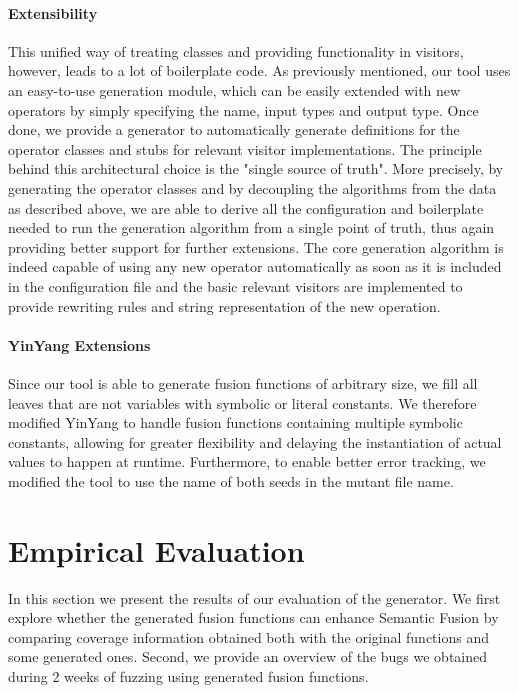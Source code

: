 \documentclass[sigplan,screen]{acmart}
\begin{document}
\paragraph{Extensibility}
This unified way of treating classes and providing functionality in visitors, however, leads to a lot of boilerplate code. As previously mentioned, our tool uses an easy-to-use generation module, which can be easily extended with new operators by simply specifying the name, input types and output type. Once done, we provide a generator to automatically generate definitions for the operator classes and stubs for relevant visitor implementations. The principle behind this architectural choice is the "single source of truth". More precisely, by generating the operator classes and by decoupling the algorithms from the data as described above, we are able to derive all the configuration and boilerplate needed to run the generation algorithm from a single point of truth, thus again providing better support for further extensions. The core generation algorithm is indeed capable of using any new operator automatically as soon as it is included in the configuration file and the basic relevant visitors are implemented to provide rewriting rules and string representation of the new operation.

\paragraph{YinYang Extensions}
Since our tool is able to generate fusion functions of arbitrary size, we fill all leaves that are not variables with symbolic or literal constants.
We therefore modified YinYang to handle fusion functions containing multiple symbolic constants, allowing for greater flexibility and delaying the instantiation of actual values to happen at runtime. Furthermore, to enable better error tracking, we modified the tool to use the name of both seeds in the mutant file name.

\section{Empirical Evaluation} \label{sec:evaluation}
In this section we present the results of our evaluation of the generator. We first explore whether the generated fusion functions can enhance Semantic Fusion by comparing coverage information obtained both with the original functions and some generated ones. Second, we provide an overview of the bugs we obtained during 2 weeks of fuzzing using generated fusion functions.
\end{document}
